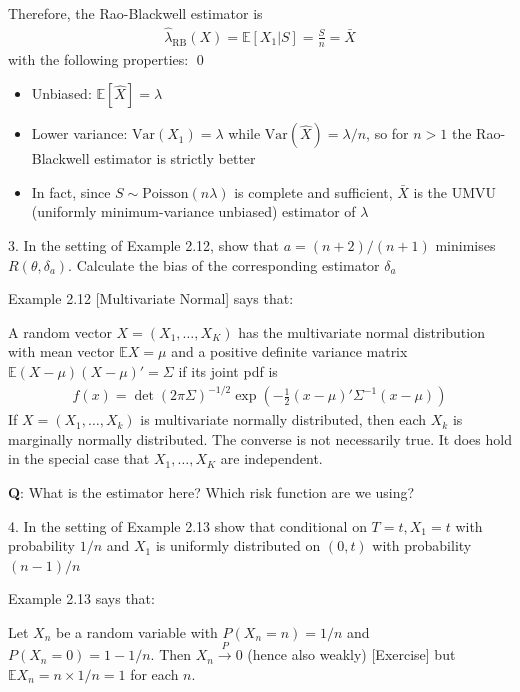 \documentclass[10pt]{article}
\begin{document}
Therefore, the Rao-Blackwell estimator is 
\begin{gather*}
    \hat{\lambda}_{\text{RB}}(X) = \mathbb{E}[X_1 | S] = \frac{S}{n} = \bar{X}
\end{gather*}
with the following properties: \qed
\begin{itemize}
    \item Unbiased: $\mathbb{E}[\hat{X}] = \lambda $
    \item Lower variance: $\text{Var}(X_1) = \lambda $ while $\text{Var}(\hat{X}) = \lambda / n $, so for $n > 1 $ the Rao-Blackwell estimator is strictly better 
    \item In fact, since $S \sim \text{Poisson}(n\lambda)$ is complete and sufficient, $\bar{X}$ is the UMVU (uniformly minimum-variance unbiased) estimator of $\lambda $
\end{itemize}

\newpage 

3. In the setting of Example 2.12, show that $a = (n + 2) / (n + 1)$ minimises $R(\theta, \delta_a)$. Calculate the bias of the corresponding estimator $\delta_a $

Example 2.12 [Multivariate Normal] says that: 

A random vector $X = (X_1, …, X_K)$ has the multivariate normal distribution with mean vector $\mathbb{E}X = \mu $ and a positive definite variance matrix $\mathbb{E}(X - \mu)(X - \mu)' = \Sigma $ if its joint pdf is 
\begin{gather*}
    f(x) = \det(2\pi\Sigma)^{-1 / 2}\exp\left(-\frac{1}{2}(x - \mu)'\Sigma^{-1}(x - \mu)\right)
\end{gather*}
If $X = (X_1, …, X_k)$ is multivariate normally distributed, then each $X_k $ is marginally normally distributed. The converse is not necessarily true. It does hold in the special case that $X_1, …, X_K $ are independent.

\textbf{Q}: What is the estimator here? Which risk function are we using?

\hfill 

4. In the setting of Example 2.13 show that conditional on $T = t, X_1 = t $ with probability $1 / n $ and $X_1 $ is uniformly distributed on $(0, t)$ with probability $(n - 1) / n $

Example 2.13 says that: 

Let $X_n $ be a random variable with $P(X_n = n) = 1 / n $ and $P(X_n = 0) = 1 - 1 / n $. Then $X_n \xrightarrow{P} 0 $ (hence also weakly) [Exercise] but $\mathbb{E}X_n = n \times 1 / n = 1 $ for each $n $.
\end{document}
